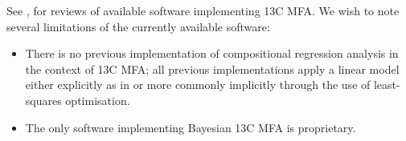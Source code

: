 \documentclass{article}
\def\tightlist{}
\begin{document}
See \citep{daiUnderstandingMetabolismFlux2017},
\citep{falcoMetabolicFluxAnalysis2022}for reviews of available software
implementing 13C MFA. We wish to note several limitations of the
currently available software:

\begin{itemize}
\tightlist
\item
  There is no previous implementation of compositional regression
  analysis in the context of 13C MFA; all previous implementations apply
  a linear model either explicitly as in \citep[Eq.
  3]{theorellBeCertainUncertainty2017} or more commonly implicitly
  through the use of least-squares optimisation.
\item
  The only software implementing Bayesian 13C MFA is proprietary.
\end{itemize}




\end{document}
